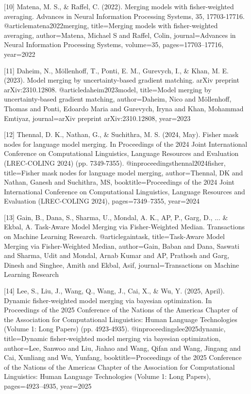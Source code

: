 \documentclass{article}
\begin{document}
{[10] Matena, M. S., & Raffel, C. (2022). Merging models with fisher-weighted averaging. Advances in Neural Information Processing Systems, 35, 17703-17716.
@article{matena2022merging,
  title={Merging models with fisher-weighted averaging},
  author={Matena, Michael S and Raffel, Colin},
  journal={Advances in Neural Information Processing Systems},
  volume={35},
  pages={17703--17716},
  year={2022}
}

[11] Daheim, N., Möllenhoff, T., Ponti, E. M., Gurevych, I., & Khan, M. E. (2023). Model merging by uncertainty-based gradient matching. arXiv preprint arXiv:2310.12808.
@article{daheim2023model,
  title={Model merging by uncertainty-based gradient matching},
  author={Daheim, Nico and M{\"o}llenhoff, Thomas and Ponti, Edoardo Maria and Gurevych, Iryna and Khan, Mohammad Emtiyaz},
  journal={arXiv preprint arXiv:2310.12808},
  year={2023}
}

[12] Thennal, D. K., Nathan, G., & Suchithra, M. S. (2024, May). Fisher mask nodes for language model merging. In Proceedings of the 2024 Joint International Conference on Computational Linguistics, Language Resources and Evaluation (LREC-COLING 2024) (pp. 7349-7355).
@inproceedings{thennal2024fisher,
  title={Fisher mask nodes for language model merging},
  author={Thennal, DK and Nathan, Ganesh and Suchithra, MS},
  booktitle={Proceedings of the 2024 Joint International Conference on Computational Linguistics, Language Resources and Evaluation (LREC-COLING 2024)},
  pages={7349--7355},
  year={2024}
}

[13] Gain, B., Dana, S., Sharma, U., Mondal, A. K., AP, P., Garg, D., ... & Ekbal, A. Task-Aware Model Merging via Fisher-Weighted Median. Transactions on Machine Learning Research.
@article{gaintask,
  title={Task-Aware Model Merging via Fisher-Weighted Median},
  author={Gain, Baban and Dana, Saswati and Sharma, Udit and Mondal, Arnab Kumar and AP, Prathosh and Garg, Dinesh and Singhee, Amith and Ekbal, Asif},
  journal={Transactions on Machine Learning Research}
}

[14] Lee, S., Liu, J., Wang, Q., Wang, J., Cai, X., & Wu, Y. (2025, April). Dynamic fisher-weighted model merging via bayesian optimization. In Proceedings of the 2025 Conference of the Nations of the Americas Chapter of the Association for Computational Linguistics: Human Language Technologies (Volume 1: Long Papers) (pp. 4923-4935).
@inproceedings{lee2025dynamic,
  title={Dynamic fisher-weighted model merging via bayesian optimization},
  author={Lee, Sanwoo and Liu, Jiahao and Wang, Qifan and Wang, Jingang and Cai, Xunliang and Wu, Yunfang},
  booktitle={Proceedings of the 2025 Conference of the Nations of the Americas Chapter of the Association for Computational Linguistics: Human Language Technologies (Volume 1: Long Papers)},
  pages={4923--4935},
  year={2025}
}

}
\end{document}

